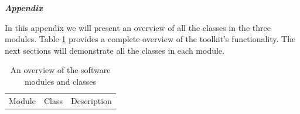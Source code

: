 \documentclass[11pt, letterpaper]{article}
\begin{document}
\noindent
\textbf{\textit{Appendix}}
\vskip0.5cm
\linenumbers

\noindent
In this appendix we will present an overview of all the classes in the three modules.
Table \ref{tab:overview} provides a complete overview of the toolkit's functionality.
The next sections will demonstrate all the classes in each module.
\begin{table}[htbp]   \footnotesize
    \centering
    \caption{An overview of the software modules and classes}\label{tab:overview}
    \begin{tabular}{ccl}
        \hline
        Module                                                                      & Class                                                         & Description                                                                                                                                                                                                            \\


\end{tabular}
\end{table}
\end{document}
